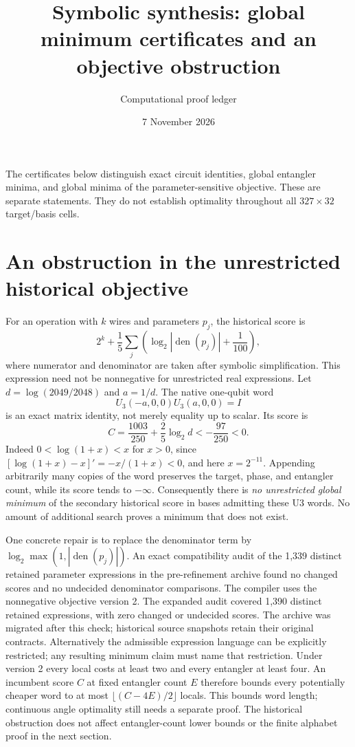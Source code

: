 \documentclass[11pt]{article}
\title{Symbolic synthesis: global minimum certificates and an objective obstruction}
\author{Computational proof ledger}
\date{7 November 2026}
\begin{document}
\maketitle
\noindent The certificates below distinguish exact circuit identities, global
entangler minima, and global minima of the parameter-sensitive objective.
These are separate statements. They do not establish optimality throughout
all $327\times32$ target/basis cells.

\section{An obstruction in the unrestricted historical objective}
For an operation with $k$ wires and parameters $p_j$, the historical score is
\[
 2^k+\frac15\sum_j\left(\log_2|\operatorname{den}(p_j)|+\frac1{100}\right),
\]
where numerator and denominator are taken after symbolic simplification.
This expression need not be nonnegative for unrestricted real expressions.
Let $d=\log(2049/2048)$ and $a=1/d$. The native one-qubit word
\[
 U_3(-a,0,0)U_3(a,0,0)=I
\]
is an exact matrix identity, not merely equality up to scalar. Its score is
\[
 C=\frac{1003}{250}+\frac25\log_2 d < -\frac{97}{250}<0.
\]
Indeed $0<\log(1+x)<x$ for $x>0$, since
$[\log(1+x)-x]'=-x/(1+x)<0$, and here $x=2^{-11}$.
Appending arbitrarily many copies of the word preserves the target, phase,
and entangler count, while its score tends to $-\infty$. Consequently there
is \emph{no unrestricted global minimum} of the secondary historical score
in bases admitting these U3 words. No amount of additional search proves a
minimum that does not exist.

One concrete repair is to replace the denominator term by
$\log_2\max(1,|\operatorname{den}(p_j)|)$. An exact compatibility audit of the
1,339 distinct retained parameter expressions in the pre-refinement archive
found no changed scores and no undecided denominator comparisons.
The compiler uses the nonnegative objective version 2.
The expanded audit covered 1,390 distinct retained expressions, with zero changed or undecided scores. The archive was migrated after this check; historical source snapshots retain their original contracts.
Alternatively the admissible expression language can be explicitly restricted;
any resulting minimum claim must name that restriction.
Under version 2 every local costs at least two and every entangler at least four.
An incumbent score $C$ at fixed entangler count $E$ therefore bounds every potentially cheaper word to at most $\lfloor(C-4E)/2\rfloor$ locals. This bounds word length; continuous angle optimality still needs a separate proof.
The historical obstruction does not affect entangler-count lower bounds or the finite
alphabet proof in the next section.
\end{document}
